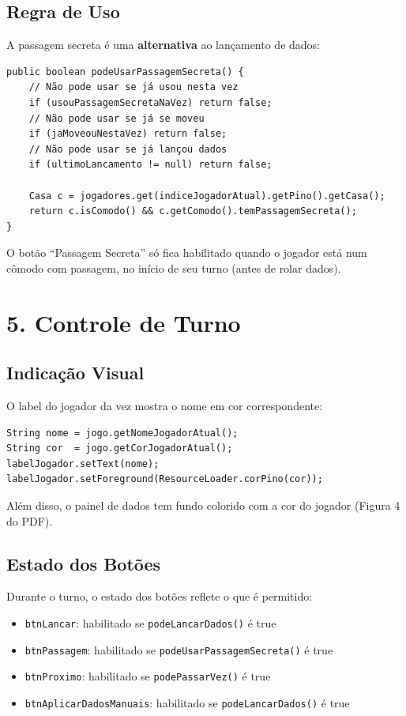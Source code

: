 \documentclass[12pt,a4paper]{report}
\begin{document}
\subsection{Regra de Uso}

A passagem secreta é uma \textbf{alternativa} ao lançamento de dados:

\begin{lstlisting}
public boolean podeUsarPassagemSecreta() {
    // Não pode usar se já usou nesta vez
    if (usouPassagemSecretaNaVez) return false;
    // Não pode usar se já se moveu
    if (jaMoveouNestaVez) return false;
    // Não pode usar se já lançou dados
    if (ultimoLancamento != null) return false;

    Casa c = jogadores.get(indiceJogadorAtual).getPino().getCasa();
    return c.isComodo() && c.getComodo().temPassagemSecreta();
}
\end{lstlisting}

O botão ``Passagem Secreta'' só fica habilitado quando o jogador está num cômodo com passagem, no início de seu turno (antes de rolar dados).

\section{5. Controle de Turno}

\subsection{Indicação Visual}

O label do jogador da vez mostra o nome em cor correspondente:

\begin{lstlisting}
String nome = jogo.getNomeJogadorAtual();
String cor  = jogo.getCorJogadorAtual();
labelJogador.setText(nome);
labelJogador.setForeground(ResourceLoader.corPino(cor));
\end{lstlisting}

Além disso, o painel de dados tem fundo colorido com a cor do jogador (Figura 4 do PDF).

\subsection{Estado dos Botões}

Durante o turno, o estado dos botões reflete o que é permitido:

\begin{itemize}
    \item \texttt{btnLancar}: habilitado se \texttt{podeLancarDados()} é true
    \item \texttt{btnPassagem}: habilitado se \texttt{podeUsarPassagemSecreta()} é true
    \item \texttt{btnProximo}: habilitado se \texttt{podePassarVez()} é true
    \item \texttt{btnAplicarDadosManuais}: habilitado se \texttt{podeLancarDados()} é true
\end{itemize}
\end{document}
